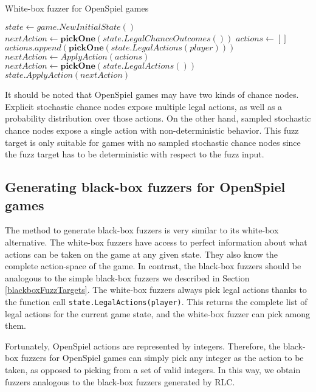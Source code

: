 \begin{algorithm}[H]
    \caption{White-box fuzzer for OpenSpiel games}
    \label{alg:var}
    \begin{algorithmic}[1]
    \STATE $state \gets game.NewInitialState()$
            \STATE $nextAction \gets \pmb{pickOne}(state.LegalChanceOutcomes())$
            \STATE $actions \gets []$
                \STATE $actions.append(\pmb{pickOne}(state.LegalActions(player)))$
            \ENDFOR
            \STATE $nextAction \gets ApplyAction(actions)$
        \ELSE
            \STATE $nextAction \gets \pmb{pickOne}(state.LegalActions())$
        \ENDIF
        \STATE $state.ApplyAction(nextAction)$
    \ENDWHILE
    \end{algorithmic}
\end{algorithm}

It should be noted that OpenSpiel games may have two kinds of chance nodes. Explicit stochastic chance nodes
expose multiple legal actions, as well as a probability distribution over those actions. On the other hand, 
sampled stochastic chance nodes expose a single action with non-deterministic behavior. This fuzz target is 
only suitable for games with no sampled stochastic chance nodes since the fuzz target has to be deterministic
with respect to the fuzz input.

\subsection{Generating black-box fuzzers for OpenSpiel games} \label{osBlackBox}
The method to generate black-box fuzzers is very similar to its white-box alternative.
The white-box fuzzers have access to perfect information about what actions can be taken on the game at any given state.
They also know the complete action-space of the game.
In contrast, the black-box fuzzers should be analogous to the simple black-box fuzzers we described in Section \ref{blackboxFuzzTargets}.
The white-box fuzzers always pick legal actions thanks to the function call \texttt{state.LegalActions(player)}.
This returns the complete list of legal actions for the current game state, and the white-box fuzzer can pick among them.

Fortunately, OpenSpiel actions are represented by integers.
Therefore, the black-box fuzzers for OpenSpiel games can simply pick any integer as the action to be taken, as opposed to picking from a set of valid integers.
In this way, we obtain fuzzers analogous to the black-box fuzzers generated by RLC.


